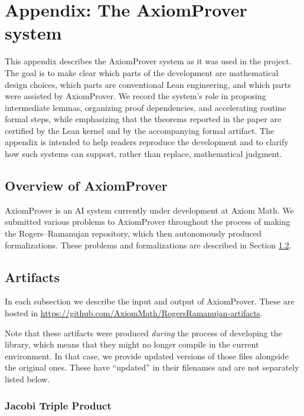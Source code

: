 \documentclass[12pt]{amsart}
\theoremstyle{definition}
\theoremstyle{remark}
\numberwithin{equation}{subsection}
\begin{document}
\section{Appendix: The AxiomProver system}\label{sec:Appendix}

This appendix describes the AxiomProver system as it was used in the project.  The goal is to make clear which parts of the development are mathematical design choices, which parts are conventional Lean engineering, and which parts were assisted by AxiomProver.  We record the system's role in proposing intermediate lemmas, organizing proof dependencies, and accelerating routine formal steps, while emphasizing that the theorems reported in the paper are certified by the Lean kernel and by the accompanying formal artifact.  The appendix is intended to help readers reproduce the development and to clarify how such systems can support, rather than replace, mathematical judgment.

\subsection{Overview of AxiomProver}
\label{sec:axiomprover}

AxiomProver is an AI system currently under development at Axiom Math. We submitted various problems to AxiomProver throughout the process of making the Rogers--Ramanujan repository, which then autonomously produced formalizations. These problems and formalizations are described in Section \ref{sec:artifacts}.



\subsection{Artifacts}
\label{sec:artifacts}

In each subsection we describe the input and output of AxiomProver. These are hosted in \url{https://github.com/AxiomMath/RogersRamanujan-artifacts}.

Note that these artifacts were produced \textit{during} the process of developing the library, which means that they might no longer compile in the current environment. In that case, we provide updated versions of those files alongside the original ones. These have ``updated'' in their filenames and are not separately listed below.

\subsubsection{Jacobi Triple Product}
\end{document}
